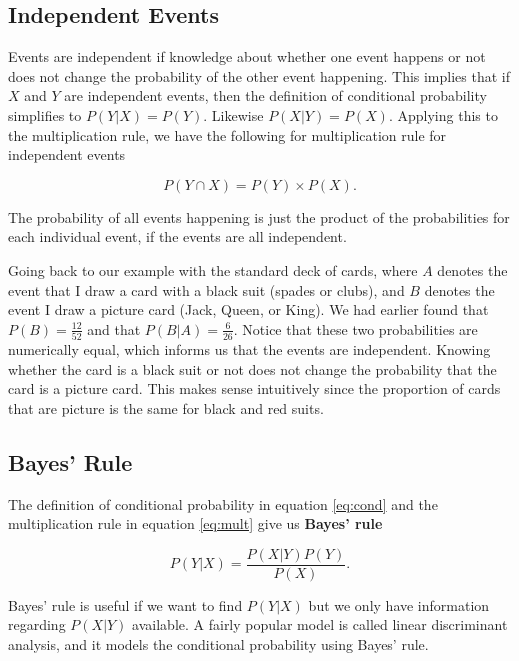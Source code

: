 \documentclass[
]{book}
\begin{document}
\hypertarget{independent-events}{%
\subsection{Independent Events}\label{independent-events}}

Events are independent if knowledge about whether one event happens or not does not change the probability of the other event happening. This implies that if \(X\) and \(Y\) are independent events, then the definition of conditional probability simplifies to \(P(Y|X) = P(Y)\). Likewise \(P(X|Y) = P(X)\). Applying this to the multiplication rule, we have the following for multiplication rule for independent events

\begin{equation} 
P(Y \cap X) = P(Y) \times P(X).
\label{eq:mult2}
\end{equation}

The probability of all events happening is just the product of the probabilities for each individual event, if the events are all independent.

Going back to our example with the standard deck of cards, where \(A\) denotes the event that I draw a card with a black suit (spades or clubs), and \(B\) denotes the event I draw a picture card (Jack, Queen, or King). We had earlier found that \(P(B) = \frac{12}{52}\) and that \(P(B|A) = \frac{6}{26}\). Notice that these two probabilities are numerically equal, which informs us that the events are independent. Knowing whether the card is a black suit or not does not change the probability that the card is a picture card. This makes sense intuitively since the proportion of cards that are picture is the same for black and red suits.

\hypertarget{bayes-rule}{%
\subsection{Bayes' Rule}\label{bayes-rule}}

The definition of conditional probability in equation \eqref{eq:cond} and the multiplication rule in equation \eqref{eq:mult} give us \textbf{Bayes' rule}

\begin{equation} 
P(Y|X) = \frac{P(X|Y)P(Y)}{P(X)}.
\label{eq:bayes}
\end{equation}

Bayes' rule is useful if we want to find \(P(Y|X)\) but we only have information regarding \(P(X|Y)\) available. A fairly popular model is called linear discriminant analysis, and it models the conditional probability using Bayes' rule.
\end{document}
